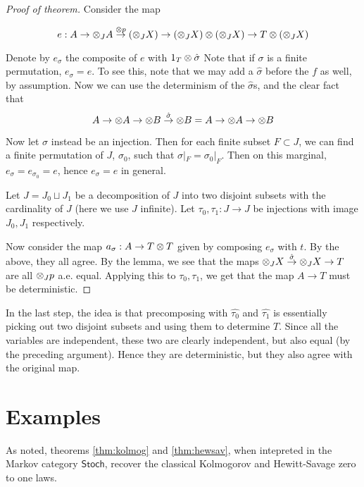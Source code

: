 \documentclass[11pt]{article}
\begin{document}
\begin{proof}[Proof of theorem]
    Consider the map 

    \[e: A \to \otimes_J A \overset{\otimes p}{\to} (\otimes_J X) \to (\otimes_J X) \otimes (\otimes_J X) \to T \otimes (\otimes_J X)\]

    Denote by $e_\sigma$ the composite of $e$ with $1_T \otimes \hat{\sigma}$
    Note that if $\sigma$ is a finite permutation, $e_\sigma = e$. To see this, note that we may add a $\hat{\sigma}$ before the $f$ as well, by assumption.
    Now we can use the determinism of the $\hat{\sigma}$s, and the clear fact that 
    \[A \to \otimes A \to \otimes B \overset{\hat{\sigma}}{\to} \otimes B = A \to \otimes A \to \otimes B\]

    Now let $\sigma$ instead be an injection. Then for each finite subset $F \subset J$, we can find a finite permutation of $J$, $\sigma_0$, such that $\sigma|_F = \sigma_0|_F$.
    Then on this marginal, $e_\sigma = e_{\sigma_0} = e$, hence $e_\sigma = e$ in general.

    Let $J = J_0 \sqcup J_1$ be a decomposition of $J$ into two disjoint subsets with the cardinality of $J$ (here we use $J$ infinite).
    Let $\tau_0, \tau_1: J \to J$ be injections with image $J_0,J_1$ respectively.

    Now consider the map $a_\sigma: A \to T \otimes T$ given by composing $e_\sigma$ with $t$.
    By the above, they all agree.
    By the lemma, we see that the maps $\otimes_J X \overset{\hat{\sigma}}{\to} \otimes_J X \to T$ are all $\otimes_J p$ a.e. equal.
    Applying this to $\tau_0,\tau_1$, we get that the map $A \to T$ must be deterministic.
\end{proof}
In the last step, the idea is that precomposing with $\hat{\tau_0}$ and $\hat{\tau_1}$ is essentially picking out two disjoint subsets and using them to determine $T$.
Since all the variables are independent, these two are clearly independent, but also equal (by the preceding argument). Hence they are deterministic, but they also agree with the original map.

\section{Examples}
As noted, theorems \cref{thm:kolmog} and \cref{thm:hewsav}, when intepreted in the Markov category $\mathsf{Stoch}$, recover the classical Kolmogorov and Hewitt-Savage zero to one laws.
\end{document}
